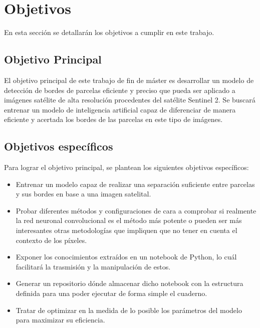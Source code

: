 \chapter{Objetivos}

En esta sección se detallarán los objetivos a cumplir en este trabajo.

\section*{Objetivo Principal}
El objetivo principal de este trabajo de fin de máster es desarrollar un modelo de detección de bordes de parcelas eficiente y preciso que pueda ser aplicado a imágenes satélite de alta resolución procedentes del satélite Sentinel 2. Se buscará entrenar un modelo de inteligencia artificial capaz de diferenciar de manera eficiente y acertada los bordes de las parcelas en este tipo de imágenes.

\section*{Objetivos específicos}
Para lograr el objetivo principal, se plantean los siguientes objetivos específicos:

\begin{itemize}
	\item Entrenar un modelo capaz de realizar una separación suficiente entre parcelas y sus bordes en base a una imagen satelital. 
	\item Probar diferentes métodos y configuraciones de cara a comprobar si realmente la red neuronal convolucional es el método más potente o pueden ser más interesantes otras metodologías que impliquen que no tener en cuenta el contexto de los píxeles.
	\item Exponer los conocimientos extraídos en un notebook de Python, lo cuál facilitará la trasmisión y la manipulación de estos.
	\item Generar un repositorio dónde almacenar dicho notebook con la estructura definida para una poder ejecutar de forma simple el cuaderno.
	\item Tratar de optimizar en la medida de lo posible los parámetros del modelo para maximizar su eficiencia.
\end{itemize}